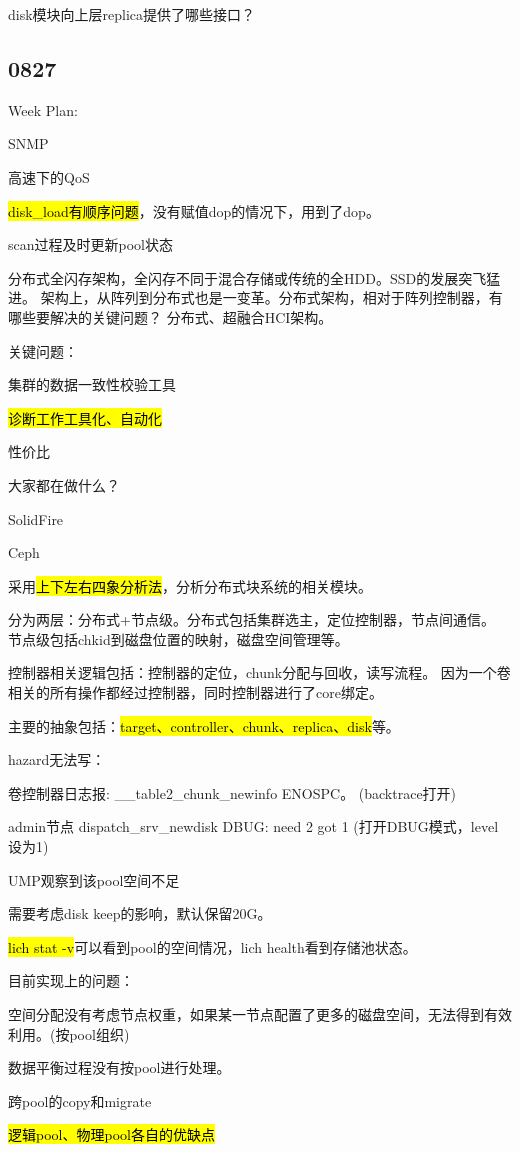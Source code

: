 disk模块向上层replica提供了哪些接口？

\subsection{0827}

Week Plan:
\begin{enumbox}
\item SNMP
\item 高速下的QoS
\item \hl{disk\_load有顺序问题}，没有赋值dop的情况下，用到了dop。
\item scan过程及时更新pool状态
\end{enumbox}

分布式全闪存架构，全闪存不同于混合存储或传统的全HDD。SSD的发展突飞猛进。
架构上，从阵列到分布式也是一变革。分布式架构，相对于阵列控制器，有哪些要解决的关键问题？
分布式、超融合HCI架构。

关键问题：
\begin{enumbox}
\item 集群的数据一致性校验工具
\item \hl{诊断工作工具化、自动化}
\item 性价比
\item 大家都在做什么？
\item SolidFire
\item Ceph
\end{enumbox}

采用\hl{上下左右四象分析法}，分析分布式块系统的相关模块。

分为两层：分布式+节点级。分布式包括集群选主，定位控制器，节点间通信。
节点级包括chkid到磁盘位置的映射，磁盘空间管理等。

控制器相关逻辑包括：控制器的定位，chunk分配与回收，读写流程。
因为一个卷相关的所有操作都经过控制器，同时控制器进行了core绑定。

主要的抽象包括：\hl{target、controller、chunk、replica、disk}等。

hazard无法写：
\begin{enumbox}
\item 卷控制器日志报: \_\_table2\_chunk\_newinfo ENOSPC。 (backtrace打开)
\item admin节点 dispatch\_srv\_newdisk DBUG: need 2 got 1 (打开DBUG模式，level设为1)
\item UMP观察到该pool空间不足
\item 需要考虑disk keep的影响，默认保留20G。
\end{enumbox}

\hl{lich stat -v}可以看到pool的空间情况，lich health看到存储池状态。

目前实现上的问题：
\begin{enumbox}
\item 空间分配没有考虑节点权重，如果某一节点配置了更多的磁盘空间，无法得到有效利用。(按pool组织)
\item 数据平衡过程没有按pool进行处理。
\item 跨pool的copy和migrate
\item \hl{逻辑pool、物理pool各自的优缺点}
\end{enumbox}
